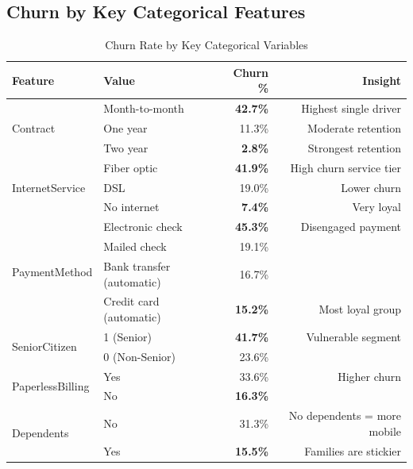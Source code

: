 \documentclass[12pt,a4paper]{article}
\begin{document}
\subsection{Churn by Key Categorical Features}

\begin{table}[H]
\centering
\caption{Churn Rate by Key Categorical Variables}
\begin{tabular}{llrr}
    \toprule
    \textbf{Feature} & \textbf{Value} & \textbf{Churn \%} & \textbf{Insight} \\
    \midrule
    \multirow{3}{*}{Contract}
        & Month-to-month  & \textcolor{churnred}{\textbf{42.7\%}} & Highest single driver \\
        & One year        & 11.3\% & Moderate retention \\
        & Two year        & \textcolor{retaingreen}{\textbf{2.8\%}}  & Strongest retention \\
    \midrule
    \multirow{3}{*}{InternetService}
        & Fiber optic     & \textcolor{churnred}{\textbf{41.9\%}} & High churn service tier \\
        & DSL             & 19.0\% & Lower churn \\
        & No internet     & \textcolor{retaingreen}{\textbf{7.4\%}}  & Very loyal \\
    \midrule
    \multirow{4}{*}{PaymentMethod}
        & Electronic check            & \textcolor{churnred}{\textbf{45.3\%}} & Disengaged payment \\
        & Mailed check                & 19.1\% & \\
        & Bank transfer (automatic)   & 16.7\% & \\
        & Credit card (automatic)     & \textcolor{retaingreen}{\textbf{15.2\%}} & Most loyal group \\
    \midrule
    \multirow{2}{*}{SeniorCitizen}
        & 1 (Senior)     & \textcolor{churnred}{\textbf{41.7\%}} & Vulnerable segment \\
        & 0 (Non-Senior) & 23.6\% & \\
    \midrule
    \multirow{2}{*}{PaperlessBilling}
        & Yes            & 33.6\% & Higher churn \\
        & No             & \textcolor{retaingreen}{\textbf{16.3\%}} & \\
    \midrule
    \multirow{2}{*}{Dependents}
        & No             & 31.3\% & No dependents = more mobile \\
        & Yes            & \textcolor{retaingreen}{\textbf{15.5\%}} & Families are stickier \\
    \bottomrule
\end{tabular}
\end{table}
\end{document}
